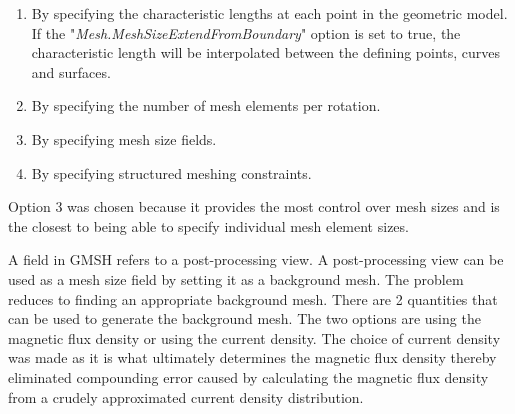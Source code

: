 \begin{enumerate}
    \item By specifying the characteristic lengths at each point in the geometric model. If the "\textit{Mesh.MeshSizeExtendFromBoundary}" option is set to true, the characteristic length will be interpolated between the defining points, curves and surfaces.
    \item By specifying the number of mesh elements per rotation.
    \item By specifying mesh size fields.
    \item By specifying structured meshing constraints.
\end{enumerate}
Option 3 was chosen because it provides the most control over mesh sizes and is the closest to being able to specify individual mesh element sizes. \par
A field in GMSH refers to a post-processing view. A post-processing view can be used as a mesh size field by setting it as a background mesh. The problem reduces to finding an appropriate background mesh. There are 2 quantities that can be used to generate the background mesh. The two options are using the magnetic flux density or using the current density. The choice of current density was made as it is what ultimately determines the magnetic flux density thereby eliminated compounding error caused by calculating the magnetic flux density from a crudely approximated current density distribution.
